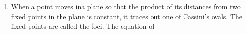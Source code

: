 \begin{enumerate}
%
%
%
%
%
%
%
%
%
%
%
\item When a point moves ina plane so that the product of its distances from two
    fixed points in the plane is constant, it traces out one of Cassini's ovals.
    The fixed points are called the foci. The equation of



\end{enumerate}
